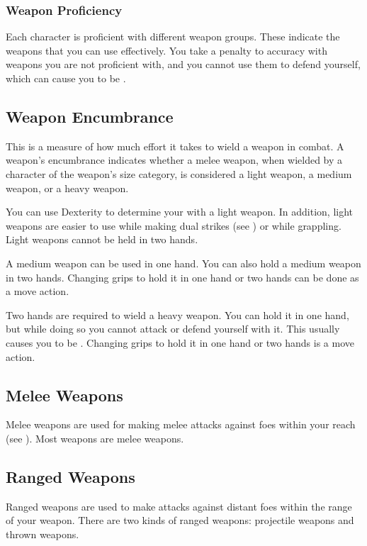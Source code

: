 \subsubsection{Weapon Proficiency}\label{Weapon Proficiency}
Each character is proficient with different weapon groups. These indicate the weapons that you can use effectively. You take a  penalty to accuracy with weapons you are not proficient with, and you cannot use them to defend yourself, which can cause you to be .

\subsection{Weapon Encumbrance}
This is a measure of how much effort it takes to wield a weapon in combat. A weapon's encumbrance indicates whether a melee weapon, when wielded by a character of the weapon's size category, is considered a light weapon, a medium weapon, or a heavy weapon.

 You can use Dexterity to determine your  with a light weapon.
In addition, light weapons are easier to use while making dual strikes (see ) or while grappling.
Light weapons cannot be held in two hands.

 A medium weapon can be used in one hand. You can also hold a medium weapon in two hands. Changing grips to hold it in one hand or two hands can be done as a move action.

 Two hands are required to wield a heavy weapon. You can hold it in one hand, but while doing so you cannot attack or defend yourself with it. This usually causes you to be . Changing grips to hold it in one hand or two hands is a move action.

\subsection{Melee Weapons}
Melee weapons are used for making melee attacks against foes within your reach (see ). Most weapons are melee weapons.

\subsection{Ranged Weapons}
Ranged weapons are used to make attacks against distant foes within the range of your weapon. There are two kinds of ranged weapons: projectile weapons and thrown weapons.


